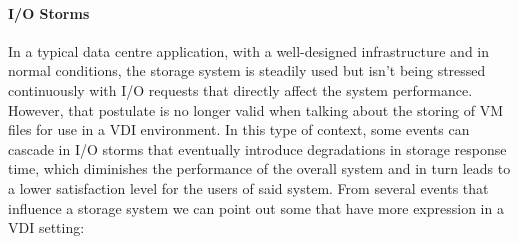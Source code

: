 \paragraph{I/O Storms}
\label{par:ios_storms}

In a typical data centre application, with a well-designed infrastructure and in normal conditions, the storage system is steadily used but isn't being stressed continuously with I/O requests that directly affect the system performance. However, that postulate is no longer valid when talking about the storing of VM files for use in a VDI environment. In this type of context, some events can cascade in I/O storms that eventually introduce degradations in storage response time, which diminishes the performance of the overall system and in turn leads to a lower satisfaction level for the users of said system.
From several events that influence a storage system we can point out some that have more expression in a VDI setting:

